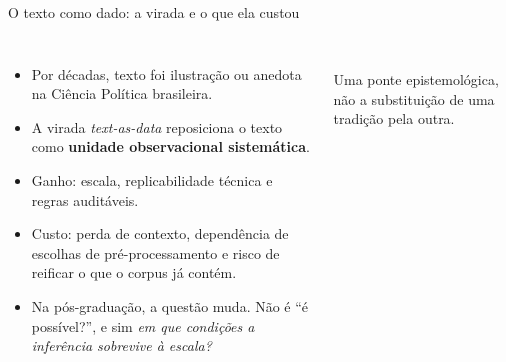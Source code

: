 \documentclass[11pt,aspectratio=169]{beamer}
\begin{document}
\begin{frame}{O texto como dado: a virada e o que ela custou}
\begin{columns}[T]
\begin{itemize}\small
  \item Por décadas, texto foi ilustração ou anedota na Ciência Política
        brasileira.
  \item A virada \emph{text-as-data} reposiciona o texto como
        \textbf{unidade observacional sistemática}.
  \item Ganho: escala, replicabilidade técnica e regras auditáveis.
  \item Custo: perda de contexto, dependência de escolhas de pré-processamento
        e risco de reificar o que o corpus já contém.
  \item Na pós-graduação, a questão muda. Não é ``é possível?'', e sim
        \emph{em que condições a inferência sobrevive à escala?}
\end{itemize}
\centering
{}\\
\vspace{0.15cm}
\footnotesize Uma ponte epistemológica, não a substituição de uma tradição pela
outra.
\end{columns}
\end{frame}
\end{document}
